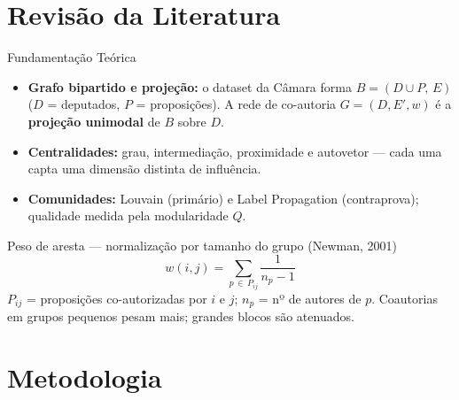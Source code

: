 \documentclass{beamer}
\begin{document}
\section{Revisão da Literatura}

\begin{frame}{Fundamentação Teórica}
\begin{itemize}
  \item \textbf{Grafo bipartido e projeção:} o dataset da Câmara forma $B = (D \cup P,\, E)$ ($D$ = deputados, $P$ = proposições). A rede de co-autoria $G = (D, E', w)$ é a \textbf{projeção unimodal} de $B$ sobre $D$.
  \item \textbf{Centralidades:} grau, intermediação, proximidade e autovetor — cada uma capta uma dimensão distinta de influência.
  \item \textbf{Comunidades:} Louvain (primário) e Label Propagation (contraprova); qualidade medida pela modularidade $Q$.
\end{itemize}

\vspace{0.2cm}
\begin{block}{Peso de aresta — normalização por tamanho do grupo (Newman, 2001)}
\[
  w(i,j) = \sum_{p \,\in\, P_{ij}} \frac{1}{n_p - 1}
\]
\footnotesize $P_{ij}$ = proposições co-autorizadas por $i$ e $j$; \; $n_p$ = nº de autores de $p$. Coautorias em grupos pequenos pesam mais; grandes blocos são atenuados. \normalsize
\end{block}
\end{frame}

\section{Metodologia}
\end{document}
